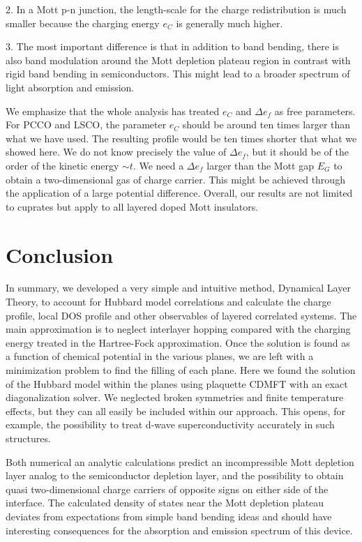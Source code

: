 \documentclass[twocolumn, preprintnumbers,prb,aps,amssymb,showpacs]{revtex4}
\begin{document}
{2. In a Mott p-n junction, the length-scale for the charge redistribution 
is much smaller because the charging energy $e_{C}$ is generally much higher. 

3. The most important difference is that in addition to band bending, there is also band modulation around the Mott depletion plateau region in contrast with rigid band bending in semiconductors. This might lead to a broader spectrum of light absorption and emission.

We emphasize that the whole analysis has treated $e_{C}$ and $\Delta
e_{f}$ as free parameters. For PCCO and LSCO, the parameter $e_{C}$
should be around ten times larger than what we have used. The resulting
profile would be ten times shorter that what we showed here. We do not know
precisely the value of $\Delta e_{f}$, but it should be of the order of the
kinetic energy $\sim t$. We need a $\Delta e_{f}$ larger
than the Mott gap $E_G$ to obtain a two-dimensional gas of charge carrier. This might be achieved through
the application of a large potential difference. Overall, our results are not limited to cuprates but apply to all layered doped Mott insulators. 

\section{Conclusion}

In summary, we developed a very simple and intuitive method, Dynamical Layer Theory, to account for Hubbard model correlations and calculate the charge profile, local DOS profile and other observables of layered correlated systems. The main approximation is to neglect interlayer hopping compared with the charging energy treated in the Hartree-Fock approximation. Once the solution is found as a function of chemical potential in the various planes, we are left with a minimization problem to find the filling of each plane. Here we found the solution of the Hubbard model within the planes using plaquette CDMFT with an exact diagonalization solver. We neglected broken symmetries and finite temperature effects, but they can all easily be included within our approach. This opens, for example, the possibility to treat d-wave superconductivity accurately in such structures. 

Both numerical an analytic calculations predict an incompressible Mott depletion layer analog to the semiconductor depletion layer, and the possibility to obtain quasi two-dimensional charge carriers of opposite signs on either side of the interface. The calculated density of states near the Mott depletion plateau deviates from expectations from simple band bending ideas and should have interesting consequences for the absorption and emission spectrum of this device.

}
\end{document}
